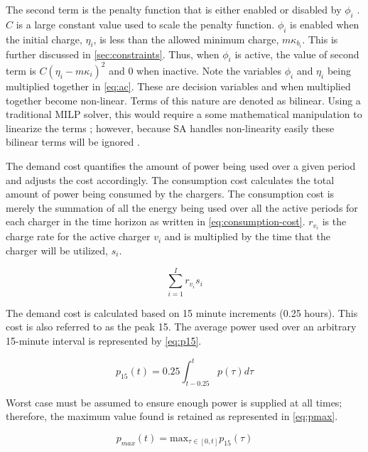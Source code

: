 \documentclass[11pt,a4paper,final]{article}
\begin{document}
The second term is the penalty function that is either enabled or disabled by \(\phi_i\)
\cite{luenberger-2008-penal-barrier-method}. \(C\) is a large constant value used to scale the penalty function. \(\phi_i\) is
enabled when the initial charge, \(\eta_i\), is less than the allowed minimum charge, \(m\kappa_{b_i}\). This is further discussed
in \ref{sec:constraints}. Thus, when \(\phi_i\) is active, the value of second term is \(C(\eta_i - m \kappa_i)^2\) and \(0\) when inactive.
Note the variables \(\phi_i\) and \(\eta_i\) being multiplied together in \ref{eq:ac}. These are decision variables and when multiplied
together become non-linear. Terms of this nature are denoted as bilinear. Using a traditional MILP solver, this would
require a some mathematical manipulation to linearize the terms \cite{rodriguez-2013-compar-asses}; however, because SA
handles non-linearity easily these bilinear terms will be ignored \cite{radosavljevic-2018-metah-optim}.

The demand cost quantifies the amount of power being used over a given period and adjusts the cost accordingly. The
consumption cost calculates the total amount of power being consumed by the chargers. The consumption cost is merely the
summation of all the energy being used over all the active periods for each charger in the time horizon as written in
\ref{eq:consumption-cost}. \(r_{v_i}\) is the charge rate for the active charger \(v_i\) and is multiplied by the time that the
charger will be utilized, \(s_i\).

\begin{equation}
\label{eq:consumption-cost}
  \sum_{i=1}^I r_{v_i}s_i
\end{equation}

The demand cost is calculated based on 15 minute increments (0.25 hours). This cost is also referred to as the peak 15. The
average power used over an arbitrary 15-minute interval is represented by \ref{eq:p15}.

\begin{equation}
\label{eq:p15}
p_{15}(t) = 0.25 \int_{t-0.25}^{t} p(\tau) d\tau
\end{equation}

Worst case must be assumed to ensure enough power is supplied at all times; therefore, the maximum value found is
retained as represented in \ref{eq:pmax}.

\begin{equation}
\label{eq:pmax}
p_{max}(t) = \text{max}_{\tau \in [0,t]}p_{15}(\tau)
\end{equation}
\end{document}
